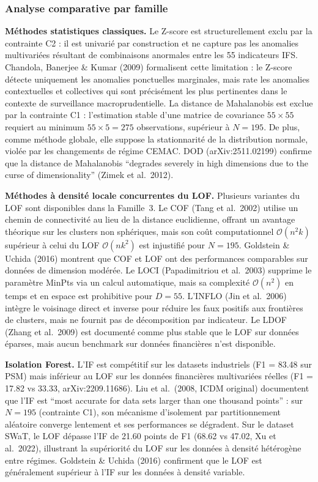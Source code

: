 \documentclass[12pt,a4paper]{article}
\begin{document}
\subsubsection{Analyse comparative par famille}

\textbf{Méthodes statistiques classiques.} Le Z-score est structurellement
exclu par la contrainte C2 : il est univarié par construction et ne capture
pas les anomalies multivariées résultant de combinaisons anormales entre les
55 indicateurs IFS. Chandola, Banerjee \& Kumar (2009) formalisent cette
limitation : le Z-score détecte uniquement les anomalies ponctuelles
marginales, mais rate les anomalies contextuelles et collectives qui sont
précisément les plus pertinentes dans le contexte de surveillance
macroprudentielle. La distance de Mahalanobis est exclue par la contrainte
C1 : l'estimation stable d'une matrice de covariance $55 \times 55$ requiert
au minimum $55 \times 5 = 275$ observations, supérieur à $N = 195$. De plus,
comme méthode globale, elle suppose la stationnarité de la distribution normale,
violée par les changements de régime CEMAC. DOD (arXiv:2511.02199) confirme
que la distance de Mahalanobis ``degrades severely in high dimensions due to
the curse of dimensionality'' (Zimek et al.\ 2012).

\textbf{Méthodes à densité locale concurrentes du LOF.} Plusieurs variantes
du LOF sont disponibles dans la Famille~3. Le COF (Tang et al.\ 2002) utilise
un chemin de connectivité au lieu de la distance euclidienne, offrant un
avantage théorique sur les clusters non sphériques, mais son coût
computationnel $\mathcal{O}(n^2 k)$ supérieur à celui du LOF $\mathcal{O}(nk^2)$
est injustifié pour $N = 195$. Goldstein \& Uchida (2016) montrent que COF et
LOF ont des performances comparables sur données de dimension modérée. Le LOCI
(Papadimitriou et al.\ 2003) supprime le paramètre MinPts via un calcul
automatique, mais sa complexité $\mathcal{O}(n^2)$ en temps et en espace est
prohibitive pour $D = 55$. L'INFLO (Jin et al.\ 2006) intègre le voisinage
direct et inverse pour réduire les faux positifs aux frontières de clusters,
mais ne fournit pas de décomposition par indicateur. Le LDOF (Zhang et al.\
2009) est documenté comme plus stable que le LOF sur données éparses, mais
aucun benchmark sur données financières n'est disponible.

\textbf{Isolation Forest.} L'IF est compétitif sur les datasets industriels
(F1 = 83.48 sur PSM) mais inférieur au LOF sur les données financières
multivariées réelles (F1 = 17.82 vs 33.33, arXiv:2209.11686). Liu et al.\
(2008, ICDM original) documentent que l'IF est ``most accurate for data sets
larger than one thousand points'' : sur $N = 195$ (contrainte C1), son mécanisme
d'isolement par partitionnement aléatoire converge lentement et ses
performances se dégradent. Sur le dataset SWaT, le LOF dépasse l'IF de 21.60
points de F1 (68.62 vs 47.02, Xu et al.\ 2022), illustrant la supériorité
du LOF sur les données à densité hétérogène entre régimes. Goldstein \& Uchida
(2016) confirment que le LOF est généralement supérieur à l'IF sur les données
à densité variable.
\end{document}
